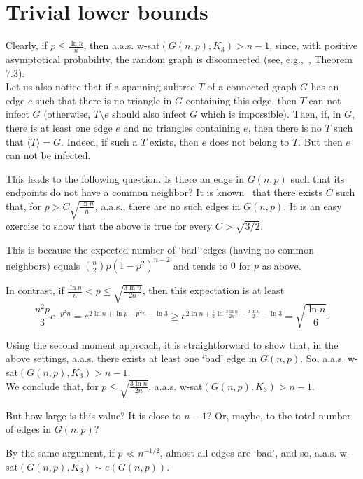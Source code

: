 \documentclass[]{article}
\begin{document}
\section{Trivial lower bounds}
\label{trivial}

Clearly, if $p\leq\frac{\ln n}{n}$, then a.a.s. w-sat$(G(n,p),K_3)>n-1$, since, with positive asymptotical probability, the random graph is disconnected (see, e.g.,~\cite{Bollobas}, Theorem 7.3).\\

Let us also notice that if a spanning subtree $T$ of a connected graph $G$ has an edge $e$ such that there is no triangle in $G$ containing this edge, then $T$ can not infect $G$ (otherwise, $T\setminus e$ should also infect $G$ which is impossible).  Then, if, in $G$, there is at least one edge $e$ and no triangles containing $e$, then there is no $T$ such that $\langle T\rangle = G$. Indeed, if such a $T$ exists, then $e$ does not belong to $T$. But then $e$ can not be infected.

This leads to the following question. Is there an edge in $G(n,p)$ such that its endpoints do not have a common neighbor? It is known~\cite{Spencer_extensions} that there exists $C$ such that, for $p>C\sqrt{\frac{\ln n}{n}}$, a.a.s., there are no such edges in $G(n,p)$. It is an easy exercise to show that the above is true for every $C>\sqrt{3/2}$.

This is because the expected number of `bad' edges (having no common neighbors) equals ${n\choose 2}p(1-p^2)^{n-2}$ and tends to $0$ for $p$ as above. 

In contrast, if $\frac{\ln n}{n}<p\leq\sqrt{\frac{3\ln n}{2n}}$, then this expectation is at least 
$$
\frac{n^2p}{3}e^{-p^2n}=e^{2\ln n+\ln p-p^2n-\ln 3}\geq e^{2\ln n+\frac{1}{2}\ln\frac{3\ln n}{2n}-\frac{3\ln n}{2}-\ln 3}=
\sqrt{\frac{\ln n}{6}}.
$$

Using the second moment approach, it is straightforward to show that, in the above settings, a.a.s. there exists at least one `bad' edge in $G(n,p)$. So, a.a.s. w-sat$(G(n,p),K_3)>n-1$.\\

We conclude that, for $p\leq\sqrt{\frac{3\ln n}{2n}}$, a.a.s. w-sat$(G(n,p),K_3)>n-1$. 

But how large is this value? It is close to $n-1$? Or, maybe, to the total number of edges in $G(n,p)$?

By the same argument, if $p\ll n^{-1/2}$, almost all edges are `bad', and so, a.a.s. w-sat$(G(n,p),K_3)\sim e(G(n,p))$. 
\end{document}
